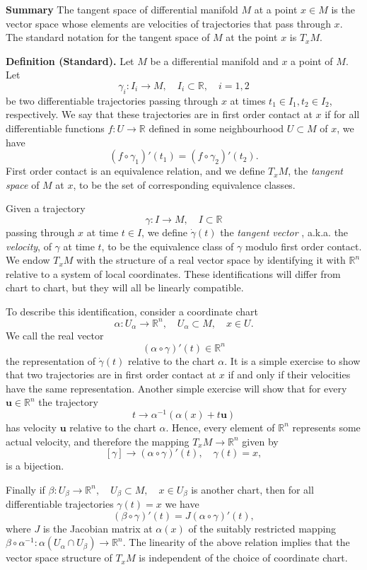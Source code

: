 \documentclass[12pt]{article}
\newcommand{\reals}{\mathbb{R}}
\newcommand{\dgamma}{\dot{\gamma}}
\newcommand{\bu}{\mathbf{u}}
\begin{document}
{\bf Summary} The tangent space of differential manifold $M$ at a
point $x\in M$ is the vector space whose elements are velocities of
trajectories that pass through $x$. The standard notation for the
tangent space of $M$ at the point $x$ is $T_x M$. 


{\bf Definition (Standard).}  Let $M$ be a differential manifold and
$x$ a point of $M$. Let
$$\gamma_i:I_i\rightarrow M,\quad I_i\subset\reals,\quad i=1,2$$
be
two differentiable trajectories passing through $x$ at times $t_1\in
I_1, t_2\in I_2$, respectively.  We say that these trajectories are in
first order contact at $x$ if for all differentiable functions
$f:U\rightarrow\reals$ defined in some neighbourhood $U\subset M$ of
$x$, we have
$$(f\circ\gamma_1)'(t_1) = (f\circ\gamma_2)'(t_2).$$
First order
contact is an equivalence relation, and we define $T_x M$, the {\em
  tangent space} of $M$ at $x$, to be the set of corresponding
equivalence classes.  

Given a trajectory
$$\gamma:I\rightarrow M,\quad I\subset\reals$$
passing through $x$ at
time $t\in I$, we define $\dgamma(t)$ the {\em tangent vector} ,
a.k.a. the {\em velocity}, of $\gamma$ at time $t$, to be the
equivalence class of $\gamma$ modulo first order contact.  We endow
$T_x M$ with the structure of a real vector space by identifying it
with $\reals^n$ relative to a system of local coordinates.   These
identifications will differ from chart to chart, but they will all be
linearly compatible.

To describe this identification, consider a coordinate chart 
$$\alpha: U_\alpha\to \reals^n,\quad U_\alpha\subset M,\quad x\in U.$$
We call the real vector
$$(\alpha\circ\gamma)'(t)\in\reals^n$$
the representation of
$\dgamma(t)$ relative to the chart $\alpha$.  It is a simple exercise
to show that two trajectories are in first order contact at $x$ if and
only if their velocities have the same representation.  Another simple
exercise will show that for every $\bu\in \reals^n$ the trajectory
$$t\to\alpha^{-1}(\alpha(x) + t\bu)$$
has velocity $\bu$ relative to the chart $\alpha$.  Hence, every
element of $\reals^n$ represents some actual velocity, and therefore
the mapping  $T_x M\to \reals^n$ given by
$$[\gamma]\to (\alpha\circ\gamma)'(t),\quad \gamma(t)=x,$$
is a bijection.

Finally if $\beta:U_\beta\to \reals^n,\quad U_\beta\subset M,\quad
x\in U_\beta$ is another chart, then for all differentiable
trajectories $\gamma(t)=x$ we have
$$(\beta\circ\gamma)'(t) = J (\alpha\circ\gamma)'(t),$$
where $J$ is
the Jacobian matrix at $\alpha(x)$ of the suitably restricted mapping
$\beta\circ\alpha^{-1}:\alpha(U_\alpha\cap U_\beta)\to\reals^n$.  The
linearity of the above relation
implies that the vector space structure of $T_xM$ is independent of the
choice of coordinate chart.
\end{document}

